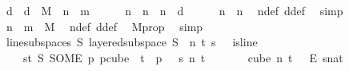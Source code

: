 \begin{isabellebody}
\ d\ \ {\isachardoublequoteopen}d\ {\isasymequiv}\ M{\isacharprime}{\kern0pt}\ {\isacharminus}{\kern0pt}\ {\isacharparenleft}{\kern0pt}n{\isacharprime}{\kern0pt}\ {\isacharplus}{\kern0pt}\ m{\isacharparenright}{\kern0pt}{\isachardoublequoteclose}\isanewline
\ \ \ \ \isamarkupfalse%
\ n\ \ {\isachardoublequoteopen}n\ {\isasymequiv}\ n{\isacharprime}{\kern0pt}\ {\isacharplus}{\kern0pt}\ d{\isachardoublequoteclose}\isanewline
\ \ \ \ \isamarkupfalse%
\ {\isachardoublequoteopen}n\ {\isasymge}\ n{\isacharprime}{\kern0pt}{\isachardoublequoteclose}\ \isamarkupfalse%
\ n{\isacharunderscore}{\kern0pt}def\ d{\isacharunderscore}{\kern0pt}def\ \isamarkupfalse%
\ simp\isanewline
\ \ \ \ \isamarkupfalse%
\ {\isachardoublequoteopen}n\ {\isacharplus}{\kern0pt}\ m\ {\isacharequal}{\kern0pt}\ M{\isacharprime}{\kern0pt}{\isachardoublequoteclose}\ \isamarkupfalse%
\ n{\isacharunderscore}{\kern0pt}def\ d{\isacharunderscore}{\kern0pt}def\ \isamarkupfalse%
\ M{\isacharprime}{\kern0pt}{\isacharunderscore}{\kern0pt}prop\ \isamarkupfalse%
\ simp\isanewline
\ \ \ \ \isamarkupfalse%
\ line{\isacharunderscore}{\kern0pt}subspace{\isacharunderscore}{\kern0pt}s{\isacharcolon}{\kern0pt}\ {\isachardoublequoteopen}{\isasymexists}S{\isachardot}{\kern0pt}\ layered{\isacharunderscore}{\kern0pt}subspace\ S\ {}\ n\ t\ s\ {\isasymchi}\ {\isasymand}\ is{\isacharunderscore}{\kern0pt}line\isanewline
\ \ \ \ {\isacharparenleft}{\kern0pt}{\isasymlambda}s{\isasymin}{\isacharbraceleft}{\kern0pt}{\isachardot}{\kern0pt}{\isachardot}{\kern0pt}{\isacharless}{\kern0pt}t{\isacharplus}{\kern0pt}{}{\isacharbraceright}{\kern0pt}{\isachardot}{\kern0pt}\ S\ {\isacharparenleft}{\kern0pt}SOME\ p{\isachardot}{\kern0pt}\ p{\isasymin}cube\ {}\ {\isacharparenleft}{\kern0pt}t{\isacharplus}{\kern0pt}{}{\isacharparenright}{\kern0pt}\ {\isasymand}\ p\ {}\ {\isacharequal}{\kern0pt}\ s{\isacharparenright}{\kern0pt}{\isacharparenright}{\kern0pt}\ n\ {\isacharparenleft}{\kern0pt}t{\isacharplus}{\kern0pt}{}{\isacharparenright}{\kern0pt}{\isachardoublequoteclose}\ \ {\isachardoublequoteopen}{\isasymchi}\isanewline
\ \ \ \ {\isasymin}\ {\isacharparenleft}{\kern0pt}cube\ n\ {\isacharparenleft}{\kern0pt}t\ {\isacharplus}{\kern0pt}\ {}{\isacharparenright}{\kern0pt}{\isacharparenright}{\kern0pt}\ {\isasymrightarrow}\isactrlsub E\ {\isacharbraceleft}{\kern0pt}{\isachardot}{\kern0pt}{\isachardot}{\kern0pt}{\isacharless}{\kern0pt}s{\isacharcolon}{\kern0pt}{\isacharcolon}{\kern0pt}nat{\isacharbraceright}{\kern0pt}{\isachardoublequoteclose}\ \ {\isasymchi}\ \isanewline

\end{isabellebody}

